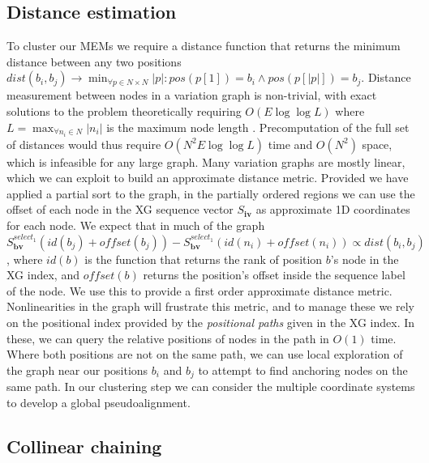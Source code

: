\subsection{Distance estimation}
To cluster our MEMs we require a distance function that returns the minimum distance between any two positions $dist(b_i, b_j) \to \min_{\forall p \in N \times N}{|p|} : pos(p[1]) = b_i \land pos(p[|p|]) = b_j$.
Distance measurement between nodes in a variation graph is non-trivial, with exact solutions to the problem theoretically requiring $O(E \log \log L)$ where $L = \max_{\forall n_i \in N} |n_i|$ is the maximum node length \cite{karlsson1983mlog}.
Precomputation of the full set of distances would thus require $O(N^2 E \log \log L)$ time and $O(N^2)$ space, which is infeasible for any large graph.
Many variation graphs are mostly linear, which we can exploit to build an approximate distance metric.
Provided we have applied a partial sort to the graph, in the partially ordered regions we can use the offset of each node in the XG sequence vector $S_\textbf{iv}$ as approximate 1D coordinates for each node.
We expect that in much of the graph $S_\textbf{bv}^{select_1}(id(b_j)+offset(b_j)) - S_\textbf{bv}^{select_1}(id(n_i)+offset(n_i)) \propto dist(b_i, b_j)$, where $id(b)$ is the function that returns the rank of position $b$'s node in the XG index, and $offset(b)$ returns the position's offset inside the sequence label of the node.
We use this to provide a first order approximate distance metric.
Nonlinearities in the graph will frustrate this metric, and to manage these we rely on the positional index provided by the \emph{positional paths} given in the XG index.
In these, we can query the relative positions of nodes in the path in $O(1)$ time.
Where both positions are not on the same path, we can use local exploration of the graph near our positions $b_i$ and $b_j$ to attempt to find anchoring nodes on the same path.
In our clustering step we can consider the multiple coordinate systems to develop a global pseudoalignment.

\subsection{Collinear chaining}
\label{sec:collinear_chaining}

